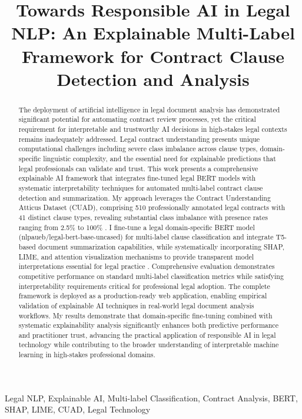 \documentclass[conference]{IEEEtran}
\begin{document}
\title{Towards Responsible AI in Legal NLP: An Explainable Multi-Label Framework for Contract Clause Detection and Analysis}

\author{
}

\maketitle

\thispagestyle{plain}
\pagestyle{plain}

\begin{abstract}
The deployment of artificial intelligence in legal document analysis has demonstrated significant potential for automating contract review processes, yet the critical requirement for interpretable and trustworthy AI decisions in high-stakes legal contexts remains inadequately addressed. Legal contract understanding presents unique computational challenges including severe class imbalance across clause types, domain-specific linguistic complexity, and the essential need for explainable predictions that legal professionals can validate and trust. This work presents a comprehensive explainable AI framework that integrates fine-tuned legal BERT models with systematic interpretability techniques for automated multi-label contract clause detection and summarization. My approach leverages the Contract Understanding Atticus Dataset (CUAD), comprising 510 professionally annotated legal contracts with 41 distinct clause types, revealing substantial class imbalance with presence rates ranging from 2.5\% to 100\% \cite{hendrycks2021cuad}. I fine-tune a legal domain-specific BERT model (nlpaueb/legal-bert-base-uncased) for multi-label clause classification \cite{chalkidis2020legal} and integrate T5-based document summarization capabilities, while systematically incorporating SHAP, LIME, and attention visualization mechanisms to provide transparent model interpretations essential for legal practice \cite{lundberg2017unified}. Comprehensive evaluation demonstrates competitive performance on standard multi-label classification metrics while satisfying interpretability requirements critical for professional legal adoption. The complete framework is deployed as a production-ready web application, enabling empirical validation of explainable AI techniques in real-world legal document analysis workflows. My results demonstrate that domain-specific fine-tuning combined with systematic explainability analysis significantly enhances both predictive performance and practitioner trust, advancing the practical application of responsible AI in legal technology while contributing to the broader understanding of interpretable machine learning in high-stakes professional domains.
\end{abstract}

\begin{IEEEkeywords}
Legal NLP, Explainable AI, Multi-label Classification, Contract Analysis, BERT, SHAP, LIME, CUAD, Legal Technology
\end{IEEEkeywords}





\end{document}
